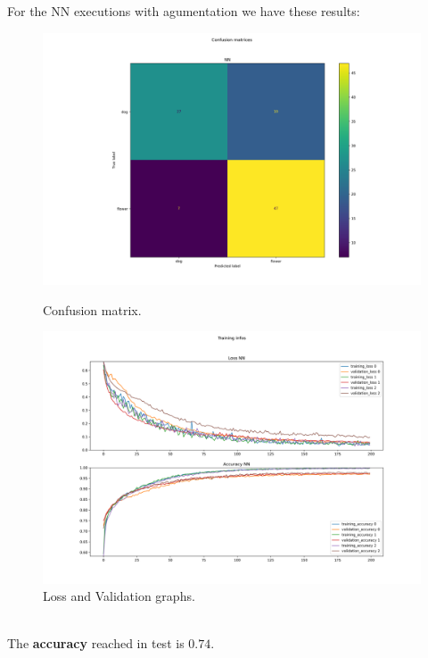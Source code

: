 \documentclass{report}
\def\weight{0.7}
\begin{document}
For the NN executions with agumentation we have these results:
\begin{figure}[ht!]
  \centering
  \begin{minipage}[b]{\weight\linewidth}
    \includegraphics[width=\linewidth]{1.augmentationNN/conf_mat.png}
    \caption{Confusion matrix.}
    \label{fig:image1}
  \end{minipage}
  \hspace{0.5cm}
  \begin{minipage}[b]{\weight\linewidth}
    \includegraphics[width=\linewidth]{1.augmentationNN/training_infos.png}
    \caption{Loss and Validation graphs.}
    \label{fig:image2}
  \end{minipage}
\end{figure}\\
The \textbf{accuracy} reached in test is $0.74$.\\
\end{document}
